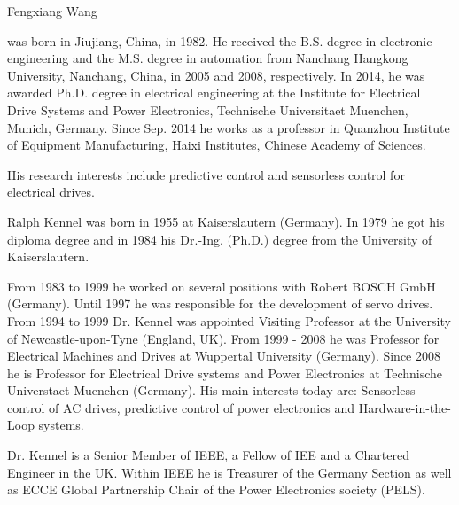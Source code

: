 \documentclass[a4paper, 8pt, twocolumn]{IEEEtran}
\begin{document}




\vspace{-8ex}

\iffalse 
\begin{IEEEbiography}{Fengxiang Wang}

was born in Jiujiang, China, in 1982. He received the B.S. degree in electronic engineering and the M.S. degree in automation from Nanchang Hangkong University, Nanchang, China, in 2005 and 2008, respectively. In 2014, he was awarded Ph.D. degree in electrical engineering at the Institute for Electrical Drive Systems and Power Electronics, Technische Universitaet Muenchen, Munich, Germany. Since Sep. 2014 he works as a professor in Quanzhou Institute of Equipment Manufacturing, Haixi Institutes, Chinese Academy of Sciences.

His research interests include predictive control and sensorless control for electrical drives.
\vspace{-12ex}
\end{IEEEbiography}


\begin{IEEEbiography}{Ralph Kennel }
was born in 1955 at Kaiserslautern (Germany). In 1979 he got his diploma degree and in 1984 his Dr.-Ing. (Ph.D.) degree from the University of Kaiserslautern.

From 1983 to 1999 he worked on several positions with Robert BOSCH GmbH (Germany). Until 1997 he was responsible for the development of servo drives. 
From 1994 to 1999 Dr. Kennel was appointed Visiting Professor at the University of Newcastle-upon-Tyne (England, UK). From 1999 - 2008 he was Professor for Electrical Machines and Drives at Wuppertal University (Germany). Since 2008 he is Professor for Electrical Drive systems and Power Electronics at Technische Universtaet Muenchen (Germany). His main interests today are: Sensorless control of AC drives, predictive control of power electronics and Hardware-in-the-Loop systems.

Dr. Kennel is a Senior Member of IEEE, a Fellow of IEE and a Chartered Engineer in the UK. Within IEEE he is Treasurer of the Germany Section as well as ECCE Global Partnership Chair of the Power Electronics society (PELS).
\vspace{-8ex}
\end{IEEEbiography}
\end{document}

